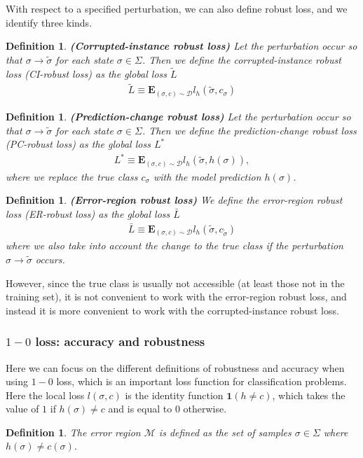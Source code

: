 \documentclass[onecolumn,prx, superscriptaddress,longbibliography,margin=1mm 11pt]{revtex4-2}
\newtheorem{definition}[theorem]{Definition}
\renewcommand{\mathbf}[1]{\boldsymbol{#1}}
\begin{document}
With respect to a specified perturbation, we can also define robust loss, and we identify three kinds.  
\begin{definition} \textbf{(Corrupted-instance robust loss)} Let the perturbation occur so that $\sigma \rightarrow \tilde{\sigma}$ for each state $\sigma \in \Sigma$. Then we define the \textit{corrupted-instance robust loss} (CI-robust loss) as the global loss $\tilde{L}$
\begin{align}
    \tilde{L} \equiv \textbf{E}_{(\sigma, c) \sim \mathcal{D}} l_h (\tilde{\sigma}, c_{\sigma})
\end{align}
\end{definition}
\begin{definition} \textbf{(Prediction-change robust loss)} Let the perturbation occur so that $\sigma \rightarrow \tilde{\sigma}$ for each state $\sigma \in \Sigma$. Then we define the \textit{prediction-change robust loss} (PC-robust loss) as the global loss $L^*$
\begin{align}
    L^* \equiv \textbf{E}_{(\sigma, c) \sim \mathcal{D}} l_h (\tilde{\sigma}, h(\sigma)),
\end{align}
where we replace the true class $c_{\sigma}$ with the model prediction $h(\sigma)$. 
\end{definition}
\begin{definition} \textbf{(Error-region robust loss)}
We define the \textit{error-region robust loss} (ER-robust loss) as the global loss $\bar{L}$
\begin{align}
    \bar{L} \equiv \textbf{E}_{(\sigma, c) \sim \mathcal{D}} l_h (\tilde{\sigma}, c_{\tilde{\sigma}})
\end{align}
where we also take into account the change to the true class if the perturbation $\sigma \rightarrow \tilde{\sigma}$ occurs. 
\end{definition}
However, since the true class is usually not accessible (at least those not in the training set), it is not convenient to work with the error-region robust loss, and instead it is more convenient to work with the corrupted-instance robust loss.

\subsubsection{$1-0$ loss: accuracy and robustness}\label{sec:10definitions}
Here we can focus on the different definitions of robustness and accuracy when using $1-0$ loss, which is an important loss function for classification problems. Here the local loss $l(\sigma, c)$ is the identity function $\mathbf{1}(h \neq c)$, which takes the value of $1$ if $h(\sigma) \neq c$ and is equal to $0$ otherwise.
\begin{definition}
The \textit{error region} $\mathcal{M}$ is defined as the set of samples $\sigma \in \Sigma$ where $h(\sigma)\neq c(\sigma)$. 
\end{definition}
\end{document}
